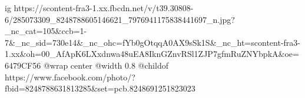  
 
 
 
 

\ifcmt
  ig https://scontent-fra3-1.xx.fbcdn.net/v/t39.30808-6/285073309_8248788605146621_7976941175838441697_n.jpg?_nc_cat=105&ccb=1-7&_nc_sid=730e14&_nc_ohc=fYb0gOtqqA0AX9sSk1S&_nc_ht=scontent-fra3-1.xx&oh=00_AfApK6LXxdnwa48uEA8IknGZnvRSl1ZJP7gfmRuZNYbpkA&oe=6479CF56
  @wrap center
  @width 0.8
  @childof https://www.facebook.com/photo/?fbid=8248788631813285&set=pcb.8248691251823023
\fi
